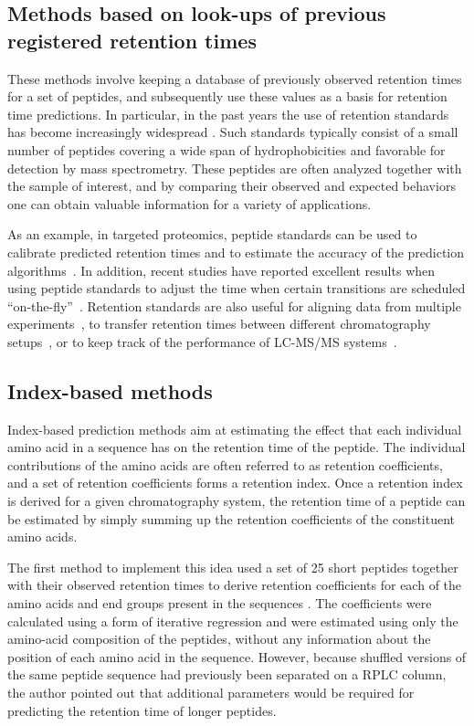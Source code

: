 \documentclass[a4paper]{article}
\begin{document}
\subsection{Methods based on look-ups of previous registered retention times}

These methods involve keeping a database of previously observed
retention times for a set of peptides, and subsequently use these
values as a basis for retention time predictions. In particular, in
the past years the use of retention standards has become increasingly
widespread \cite{olegstd, irt}. Such standards typically consist of a
small number of peptides covering a wide span of hydrophobicities and
favorable for detection by mass spectrometry. These peptides are often
analyzed together with the sample of interest, and by comparing their
observed and expected behaviors one can obtain valuable information
for a variety of applications.

\vspace{0.15cm}

As an example, in targeted proteomics, peptide standards can be used to
 calibrate predicted retention times and to estimate the accuracy of
 the prediction algorithms~\cite{Kiyonami01022011}. In addition,
 recent studies have reported excellent results when using peptide
 standards to adjust the time when certain transitions are scheduled
 ``on-the-fly''~\cite{seb, irt}. Retention standards are also useful
 for aligning data from multiple experiments~\cite{petritis2003}, to
 transfer retention times between different chromatography
 setups~\cite{seb}, or to keep track of the performance of LC-MS/MS
 systems~\cite{qcal}.

\subsection{Index-based methods}
\label{sec:irt}

Index-based prediction methods aim at estimating the effect that each
individual amino acid in a sequence has on the retention time of the
peptide. The individual contributions of the amino acids are often
referred to as retention coefficients, and a set of retention
coefficients forms a retention index. Once a retention index is
derived for a given chromatography system, the retention time of a
peptide can be estimated by simply summing up the retention
coefficients of the constituent amino acids.

The first method to implement this idea used a set of 25 short
peptides together with their observed retention times to derive
retention coefficients for each of the amino acids and end groups
present in the sequences \cite{meek1980}. The coefficients were
calculated using a form of iterative regression and were estimated
using only the amino-acid composition of the peptides, without any
information about the position of each amino acid in the
sequence. However, because shuffled versions of the same peptide
sequence had previously been separated on a RPLC column, the author
pointed out that additional parameters would be required for
predicting the retention time of longer peptides.
\end{document}
